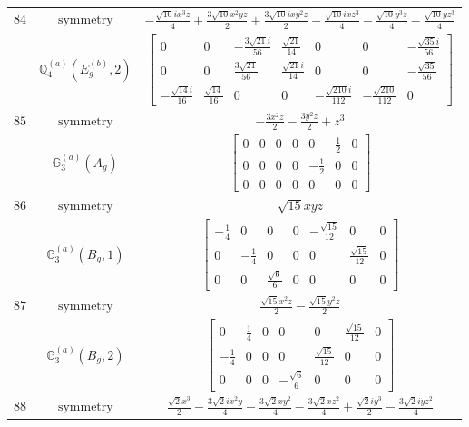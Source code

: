 \documentclass[fleqn,8pt,landscape]{jsarticle}
\begin{document}
\begin{longtable}{ccc}
$ 84 $ & $ \text{symmetry} $ & $ - \frac{\sqrt{10} i x^{3} z}{4} + \frac{3 \sqrt{10} x^{2} y z}{2} + \frac{3 \sqrt{10} i x y^{2} z}{2} - \frac{\sqrt{10} i x z^{3}}{4} - \frac{\sqrt{10} y^{3} z}{4} - \frac{\sqrt{10} y z^{3}}{4} $ \\
$  $ & $ \mathbb{Q}_{4}^{(a)}(E_{g}^{(b)},2) $ & $ \begin{bmatrix} 0 & 0 & - \frac{3 \sqrt{21} i}{56} & \frac{\sqrt{21}}{14} & 0 & 0 & - \frac{\sqrt{35} i}{56} \\ 0 & 0 & \frac{3 \sqrt{21}}{56} & \frac{\sqrt{21} i}{14} & 0 & 0 & - \frac{\sqrt{35}}{56} \\ - \frac{\sqrt{14} i}{16} & \frac{\sqrt{14}}{16} & 0 & 0 & - \frac{\sqrt{210} i}{112} & - \frac{\sqrt{210}}{112} & 0 \end{bmatrix} $ \\ \hline
$ 85 $ & $ \text{symmetry} $ & $ - \frac{3 x^{2} z}{2} - \frac{3 y^{2} z}{2} + z^{3} $ \\
$  $ & $ \mathbb{G}_{3}^{(a)}(A_{g}) $ & $ \begin{bmatrix} 0 & 0 & 0 & 0 & 0 & \frac{1}{2} & 0 \\ 0 & 0 & 0 & 0 & - \frac{1}{2} & 0 & 0 \\ 0 & 0 & 0 & 0 & 0 & 0 & 0 \end{bmatrix} $ \\ \hline
$ 86 $ & $ \text{symmetry} $ & $ \sqrt{15} x y z $ \\
$  $ & $ \mathbb{G}_{3}^{(a)}(B_{g},1) $ & $ \begin{bmatrix} - \frac{1}{4} & 0 & 0 & 0 & - \frac{\sqrt{15}}{12} & 0 & 0 \\ 0 & - \frac{1}{4} & 0 & 0 & 0 & \frac{\sqrt{15}}{12} & 0 \\ 0 & 0 & \frac{\sqrt{6}}{6} & 0 & 0 & 0 & 0 \end{bmatrix} $ \\ \hline
$ 87 $ & $ \text{symmetry} $ & $ \frac{\sqrt{15} x^{2} z}{2} - \frac{\sqrt{15} y^{2} z}{2} $ \\
$  $ & $ \mathbb{G}_{3}^{(a)}(B_{g},2) $ & $ \begin{bmatrix} 0 & \frac{1}{4} & 0 & 0 & 0 & \frac{\sqrt{15}}{12} & 0 \\ - \frac{1}{4} & 0 & 0 & 0 & \frac{\sqrt{15}}{12} & 0 & 0 \\ 0 & 0 & 0 & - \frac{\sqrt{6}}{6} & 0 & 0 & 0 \end{bmatrix} $ \\ \hline
$ 88 $ & $ \text{symmetry} $ & $ \frac{\sqrt{2} x^{3}}{2} - \frac{3 \sqrt{2} i x^{2} y}{4} - \frac{3 \sqrt{2} x y^{2}}{4} - \frac{3 \sqrt{2} x z^{2}}{4} + \frac{\sqrt{2} i y^{3}}{2} - \frac{3 \sqrt{2} i y z^{2}}{4} $ \\

\end{longtable}
\end{document}
